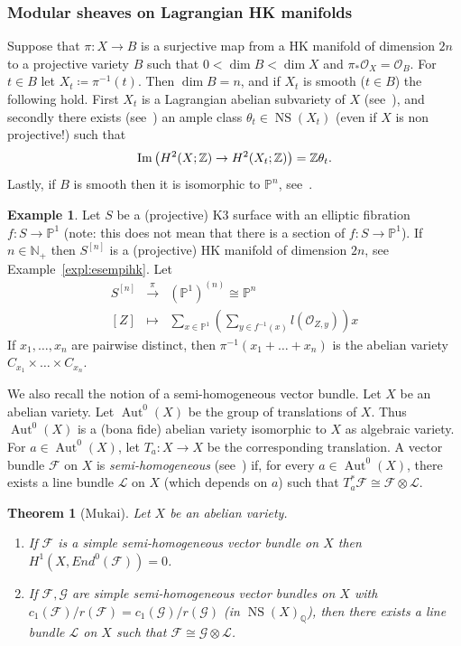 \documentclass[11pt]{amsart}
\newcommand{\NN}{{\mathbb N}}
\newcommand{\PP}{{\mathbb P}}
\newcommand{\QQ}{{\mathbb Q}}
\newcommand{\ZZ}{{\mathbb Z}}
\let\mathcal\mathscr
\def\cF{\mathcal{F}}
\def\cG{\mathcal{G}}
\def\cL{\mathcal{L}}
\def\cO{\mathcal{O}}
\DeclareMathOperator{\Aut}{Aut}
\def\Im{\mathop{\rm Im}\nolimits}
\DeclareMathOperator{\NS}{NS}
\newtheorem{thm}[lmm]{Theorem}
\theoremstyle{definition}
\newtheorem{expl}[lmm]{Example}
\theoremstyle{remark}
\begin{document}
\subsubsection{Modular sheaves on Lagrangian HK manifolds}
%
Suppose that $\pi\colon X\to B$ is a surjective map from a HK manifold of dimension $2n$ to a  projective variety $B$ such that  
$0<\dim B<\dim X$ and $\pi_{*}\cO_X=\cO_B$. For  $t\in B$ let  $X_t\coloneqq \pi^{-1}(t)$.
Then $\dim B=n$, and if $X_t$ is smooth ($t\in B$)  the following hold.
First $X_t$ is a Lagrangian abelian subvariety of $X$ (see~\cite{matsushita:hkfibrate,matsushita:hkfiblagr}), and secondly there exists (see~\cite{wieneck1}) an ample 
class $\theta_t\in \NS(X_t)$ (even if $X$ is non projective!) such that
%
\begin{equation}\label{classeteta}
%
\Im\left(H^2(X;\ZZ)\to H^2(X_t;\ZZ)\right)=\ZZ\theta_t.
%
\end{equation}
%
Lastly, if $B$ is smooth then it is isomorphic to $\PP^n$, see~\cite{hwang:basefibr}.
%
\begin{expl}\label{expl:essennelagr}
%
Let $S$ be a (projective) K3 surface with an elliptic fibration $f\colon S\to\PP^1$ (note: this does not mean that there is a section of   $f\colon S\to\PP^1$). If $n\in\NN_{+}$ then $S^{[n]}$ is a (projective) HK manifold of dimension $2n$, see Example~\ref{expl:esempihk}. Let  
%
\begin{equation}
%
\begin{matrix}
%
S^{[n]} & \xrightarrow{\pi} & (\PP^1)^{(n)}\cong\PP^n \\
%
[Z] & \mapsto & \sum_{x\in\PP^1}\left(\sum_{y\in f^{-1}(x)}l(\cO_{Z,y})\right)x
%
\end{matrix}
%
\end{equation}
%
If $x_1,\ldots, x_n$ are pairwise distinct, then  $\pi^{-1}(x_1+\ldots+ x_n)$ is  the abelian variety  $C_{x_1}\times\ldots\times C_{x_n}$.
%
\end{expl}
%
We also recall the notion of a semi-homogeneous vector bundle. Let  $X$ be   an abelian variety.
Let $\Aut^0(X)$ be the group of translations of $X$.  Thus $\Aut^0(X)$ is a (bona fide) abelian variety isomorphic to $X$ as algebraic variety.
 For $a\in \Aut^0(X)$, let $T_a\colon X\to X$ be the corresponding translation.  
  A vector bundle  $\cF$ on $X$ is  \emph{semi-homogeneous} (see~\cite{muksemi}) if, for every $a\in \Aut^0(X)$, there exists a line bundle $\cL$ on $X$ (which depends on $a$) such that $T_a^{*}\cF\cong \cF\otimes\cL$.   
\begin{thm}[Mukai]\label{thm:vivasemihom}
%
Let  $X$ be  an abelian variety. 
%
\begin{enumerate}
%
\item
%
If $\cF$ is  a simple semi-homogeneous  vector bundle on $X$ then $H^1(X,End^0(\cF))=0$. 
%
\item
%
If $\cF,\cG$ are simple semi-homogeneous  vector bundles on $X$ with $c_1(\cF)/r(\cF)=c_1(\cG)/r(\cG)$ (in $\NS(X)_{\QQ}$), then 
there exists a line bundle $\cL$ on $X$ such that $\cF\cong\cG\otimes\cL$.
%
\end{enumerate}
%
%
\end{thm}
\end{document}
